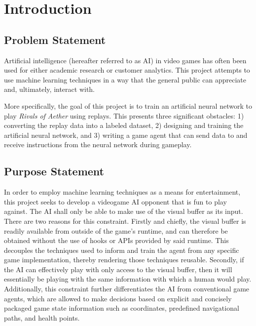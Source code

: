 \chapter{Introduction}


\section{Problem Statement}

Artificial intelligence (hereafter referred to as AI) in video games has often been used for either academic research or customer analytics. This project attempts to use machine learning techniques in a way that the general public can appreciate and, ultimately, interact with.

More specifically, the goal of this project is to train an artificial neural network to play \textit{Rivals of Aether} using replays. This presents three significant obstacles: 1) converting the replay data into a labeled dataset, 2) designing and training the artificial neural network, and 3) writing a game agent that can send data to and receive instructions from the neural network during gameplay.




\section{Purpose Statement}

 In order to employ machine learning techniques as a means for entertainment, this project seeks to develop a videogame AI opponent that is fun to play against. The AI shall only be able to make use of the visual buffer as its input. There are two reasons for this constraint. Firstly and chiefly, the visual buffer is readily available from outside of the game's runtime, and can therefore be obtained without the use of hooks or APIs provided by said runtime. This decouples the techniques used to inform and train the agent from any specific game implementation, thereby rendering those techniques reusable. Secondly, if the AI can effectively play with only access to the visual buffer, then it will essentially be playing with the same information with which a human would play. Additionally, this constraint further differentiates the AI from conventional game agents, which are allowed to make decisions based on explicit and concisely packaged game state information such as coordinates, predefined navigational paths, and health points.
 
